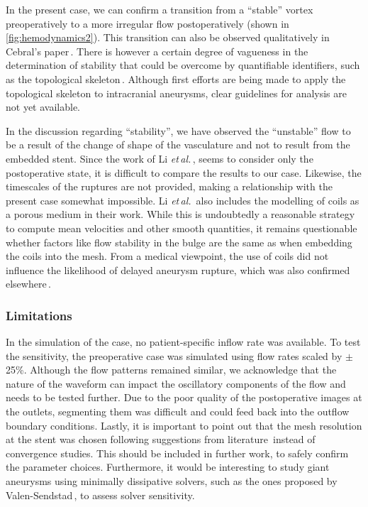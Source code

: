 In the present case, we can confirm a transition from a ``stable'' vortex preoperatively to a more irregular flow postoperatively (shown in \autoref{fig:hemodynamics2}). This transition can also be observed qualitatively in Cebral's paper\,\cite{Cebral2011}. There is however a certain degree of vagueness in the determination of stability that could be overcome by quantifiable identifiers, such as the topological skeleton\,\cite{Morbiducci2020}. Although first efforts are being made to apply the topological skeleton to intracranial aneurysms\cite{Mazzi2020}, clear guidelines for analysis are not yet available.

In the discussion regarding ``stability'', we have observed the ``unstable'' flow to be a result of the change of shape of the vasculature and not to result from the embedded stent. Since the work of Li \textit{et\,al.}\,\cite{Li2019}, seems to consider only the postoperative state, it is difficult to compare the results to our case. Likewise, the timescales of the ruptures are not provided, making a relationship with the present case somewhat impossible. Li \textit{et\,al.}\,\cite{Li2019} also includes the modelling of coils as a porous medium in their work. While this is undoubtedly a reasonable strategy to compute mean velocities and other smooth quantities, it remains questionable whether factors like flow stability in the bulge are the same as when embedding the coils into the mesh. From a medical viewpoint, the use of coils did not influence the likelihood of delayed aneurysm rupture, which was also confirmed elsewhere\,\cite{Kulcsar2011, Hirato2023}.

\subsubsection*{Limitations}
In the simulation of the case, no patient-specific inflow rate was available. To test the sensitivity, the preoperative case was simulated using flow rates scaled by $\pm$25\%. Although the flow patterns remained similar, we acknowledge that the nature of the waveform can impact the oscillatory components of the flow and needs to be tested further. Due to the poor quality of the postoperative images at the outlets, segmenting them was difficult and could feed back into the outflow boundary conditions. Lastly, it is important to point out that the mesh resolution at the stent was chosen following suggestions from literature\,\cite{Janiga2015, Larrabide2016} instead of convergence studies. This should be included in further work, to safely confirm the parameter choices. Furthermore, it would be interesting to study giant aneurysms using minimally dissipative solvers, such as the ones proposed by Valen-Sendstad\,\cite{Valen-Sendstad2014}, to assess solver sensitivity.

